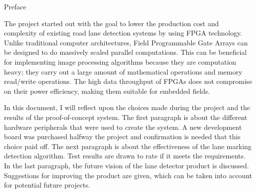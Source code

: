 \documentclass{matthijs}
\begin{document}

	\thispagestyle{empty}
	
	\begin{inhoudspagina}

	\end{inhoudspagina}


	\begin{hoofdstuk}{Preface}

		The project started out with the goal to lower the production cost and complexity of existing road lane detection systems by using FPGA technology.
		Unlike traditional computer architectures, Field Programmable Gate Arrays can be designed to do massively scaled parallel computations.
		This can be beneficial for implementing image processing algorithms because they are computation heavy; they carry out a large amount of mathematical operations and memory read/write operations.
		The high data throughput of FPGAs does not compromise on their power efficiency, making them suitable for embedded fields.

		\bigskip

		In this document, I will reflect upon the choices made during the project and the results of the proof-of-concept system.
		The first paragraph is about the different hardware peripherals that were used to create the system.
		A new development board was purchased halfway the project and confirmation is needed that this choice paid off.
		The next paragraph is about the effectiveness of the lane marking detection algorithm.
		Test results are drawn to rate if it meets the requirements.
		In the last paragraph, the future vision of the lane detector product is discussed.
		Suggestions for improving the product are given, which can be taken into account for potential future projects.

	\end{hoofdstuk}
\end{document}
